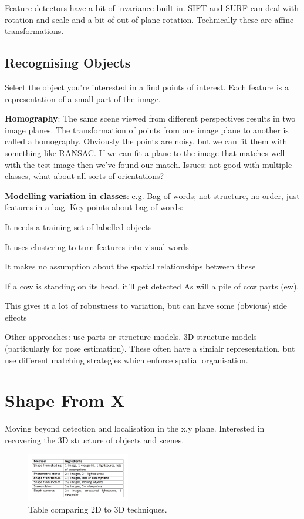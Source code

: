 \documentclass[8pt]{extarticle}
\begin{document}
\begin{multicols}{2}
Feature detectors have a bit of invariance built in. SIFT and SURF can deal with rotation and scale and a bit of out of plane rotation. Technically these are affine transformations.

\subsection{Recognising Objects}
Select the object you're interested in a find points of interest. Each feature is a representation of a small part of the image.

\textbf{Homography}: The same scene viewed from different perspectives results in two image planes. The transformation of points from one image plane to another is called a homography. Obviously the points are noisy, but we can fit them with something like RANSAC. If we can fit a plane to the image that matches well with the test image then we've found our match. Issues: not good with multiple classes, what about all sorts of orientations?

\textbf{Modelling variation in classes}: e.g. Bag-of-words; not structure, no order, just features in a bag. Key points about bag-of-words:
\begin{compactitem}
    \item It needs a training set of labelled objects
    \item It uses clustering to turn features into visual words
    \item It makes no assumption about the spatial relationships between these
    \item If a cow is standing on its head, it’ll get detected As will a pile of cow parts (ew).
    \item This gives it a lot of robustness to variation, but can have some (obvious) side effects
\end{compactitem}

Other approaches: use parts or structure models. 3D structure models (particularly for pose estimation). These often have a simialr representation, but use different matching strategies which enforce spatial organisation.

\section{Shape From X}
Moving beyond detection and localisation in the x,y plane. Interested in recovering the 3D structure of objects and scenes.
\begin{figure}[H]
    \centering
    \includegraphics[width=0.4\textwidth]{2dto3d.png}
    \caption{Table comparing 2D to 3D techniques.}
    \label{fig:2D-to-3D}
\end{figure}


\end{multicols}
\end{document}
